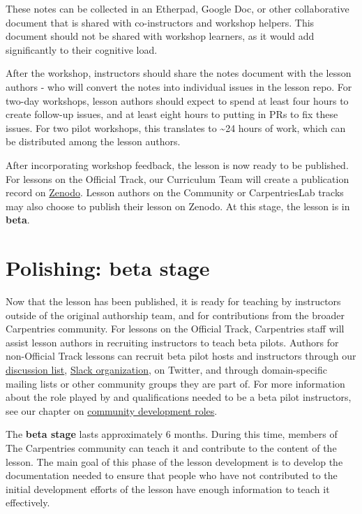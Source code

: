 \documentclass[
]{book}
\begin{document}
These notes can be collected in an Etherpad, Google Doc, or other collaborative document that is shared
with co-instructors and workshop helpers. This document should not be shared with workshop learners,
as it would add significantly to their cognitive load.

After the workshop, instructors should share the notes document with the lesson authors - who
will convert the notes into individual issues in the lesson repo. For two-day workshops, lesson authors should expect
to spend at least four hours to create follow-up issues, and at least
eight hours to putting in PRs to fix these issues. For two pilot workshops, this translates
to \textasciitilde24 hours of work, which can be distributed among the lesson authors.

After incorporating workshop feedback, the lesson is
now ready to be published. For lessons on the Official
Track, our Curriculum Team will create a publication
record on \href{https://zenodo.org/communities/carpentries/?page=1\&size=20}{Zenodo}. Lesson authors on the Community or CarpentriesLab tracks
may also choose to publish their lesson on Zenodo. At this stage, the lesson is in \textbf{beta}.

\hypertarget{polishing-beta-stage}{%
\section{Polishing: beta stage}\label{polishing-beta-stage}}

Now that the lesson has been published, it is ready
for teaching by instructors outside of the original
authorship team, and for contributions from the broader
Carpentries community. For lessons on the Official Track,
Carpentries staff will assist lesson authors in recruiting instructors
to teach beta pilots. Authors for non-Official Track lessons
can recruit beta pilot hosts and instructors through our
\href{https://carpentries.topicbox.com/groups/discuss}{discussion list}, \href{https://swc-slack-invite.herokuapp.com/}{Slack organization},
on Twitter, and through domain-specific mailing lists
or other community groups they are part of.
For more information about the role played by
and qualifications needed to be a beta pilot instructors, see
our chapter on \href{https://cdh.carpentries.org/community-development-roles.html\#beta-pilot-instructors}{community development roles}.

The \textbf{beta stage} lasts approximately 6 months. During this time, members of
The Carpentries community can teach it and contribute to the content of the lesson.
The main goal of this phase of the lesson development is to develop the documentation
needed to ensure that people who have not contributed to the initial development
efforts of the lesson have enough information to teach it effectively.
\end{document}
